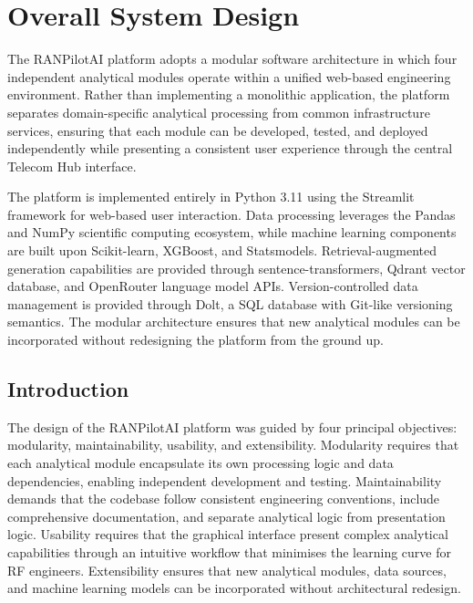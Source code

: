 \chapter{Overall System Design}
\label{chap:system_design}

The RANPilotAI platform adopts a modular software architecture in which four independent analytical modules operate within a unified web-based engineering environment. Rather than implementing a monolithic application, the platform separates domain-specific analytical processing from common infrastructure services, ensuring that each module can be developed, tested, and deployed independently while presenting a consistent user experience through the central Telecom Hub interface.

The platform is implemented entirely in Python 3.11 using the Streamlit framework for web-based user interaction. Data processing leverages the Pandas and NumPy scientific computing ecosystem, while machine learning components are built upon Scikit-learn, XGBoost, and Statsmodels. Retrieval-augmented generation capabilities are provided through sentence-transformers, Qdrant vector database, and OpenRouter language model APIs. Version-controlled data management is provided through Dolt, a SQL database with Git-like versioning semantics. The modular architecture ensures that new analytical modules can be incorporated without redesigning the platform from the ground up.

\section{Introduction}

The design of the RANPilotAI platform was guided by four principal objectives: modularity, maintainability, usability, and extensibility. Modularity requires that each analytical module encapsulate its own processing logic and data dependencies, enabling independent development and testing. Maintainability demands that the codebase follow consistent engineering conventions, include comprehensive documentation, and separate analytical logic from presentation logic. Usability requires that the graphical interface present complex analytical capabilities through an intuitive workflow that minimises the learning curve for RF engineers. Extensibility ensures that new analytical modules, data sources, and machine learning models can be incorporated without architectural redesign.

